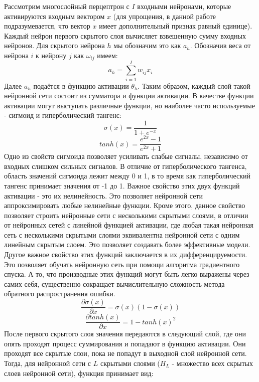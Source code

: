     Рассмотрим многослойный перцептрон с $I$ входными нейронами, которые активируются входным вектором $x$ (для упрощения, в данной работе подразумевается, что вектор $x$ имеет дополнительный признак равный единице). Каждый нейрон первого скрытого слоя вычисляет взвешенную сумму входных нейронов. Для скрытого нейрона $h$ мы обозначим это как $a_{h}$. Обозначив веса от нейрона $i$ к нейрону $j$ как $\omega_{ij}$ имеем:
    \begin{equation}
    a_{h}=\sum_{i=1}^{I}w_{ij}x_{i}
    \end{equation}
    Далее $a_{h}$ подаётся в функцию активации $\theta_{h}$. Таким образом, каждый слой такой нейронной сети состоит из сумматора и функции активации. В качестве функции активации могут выступать различные функции, но наиболее часто используемые - сигмоид и гиперболический тангенс:
    \begin{equation}
    \sigma(x) = \frac{1}{1+e^{-x}}
    \end{equation}
    \begin{equation}
    tanh(x) = \frac{e^{2x}-1}{e^{2x}+1}
    \end{equation}
    Одно из свойств сигмоида позволяет усиливать слабые сигналы, независимо от входных слишком сильных сигналов. В отличие от гиперболического тангенса, область значений сигмоида лежит между 0 и 1, в то время как гиперболический тангенс принимает значения от -1 до 1. Важное свойство этих двух функций активации - это их нелинейность. Это позволяет нейронной сети аппроксимировать любые нелинейные функции. Кроме этого, данное свойство позволяет строить нейронные сети с несколькими скрытыми слоями, в отличии от нейронных сетей с линейной функцией активации, где любая такая нейронная сеть с несколькими скрытыми слоями эквивалентна нейронной сети с одним линейным скрытым слоем. Это позволяет создавать более эффективные модели.
    Другое важное свойство этих функций заключается в их дифференцируемости. Это позволяет обучать нейронную сеть при помощи алгоритма градиентного спуска. А то, что производные этих функций могут быть легко выражены через самих себя, существенно сокращает вычислительную сложность метода обратного распространения ошибки.
    \begin{equation}
    \frac{\partial \sigma (x)}{\partial x} = \sigma (x)(1 - \sigma (x))
    \end{equation}
    \begin{equation}
    \frac{\partial tanh(x)}{\partial x} = 1 - tanh(x)^2
    \end{equation}
    После первого скрытого слоя значения передаются в следующий слой, где они опять проходят процесс суммирования и попадают в функцию активации. Они проходят все скрытые слои, пока не попадут в выходной слой нейронной сети. Тогда, для нейронной сети с $L$ скрытыми слоями ($H_{L}$ - множество всех скрытых слоев нейронной сети), функция принимает вид:
